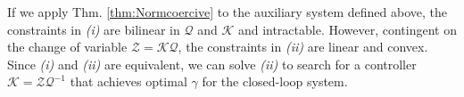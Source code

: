 \documentclass[letterpaper, 10 pt, conference]{ieeeconf}
\newtheorem{definition}{Definition}
\newcommand{\mcl}[1]{\mathcal{#1}}
\newcommand{\mbf}[1]{\mathbf{#1}}
\theoremstyle{definition}
\begin{document}


If we apply Thm. \ref{thm:Normcoercive} to the auxiliary system defined above, the constraints in \textit{(i)} are bilinear in $\mcl Q$ and $\mcl K$ and intractable. However, contingent on the change of variable $\mcl Z=\mcl K \mcl Q$, the constraints in \textit{(ii)} are linear and convex. Since \textit{(i)} and \textit{(ii)} are equivalent, we can solve \textit{(ii)} to search for a controller $\mcl K = \mcl Z\mcl Q^{-1}$ that achieves optimal $\gamma$ for the closed-loop system.


\end{document}
